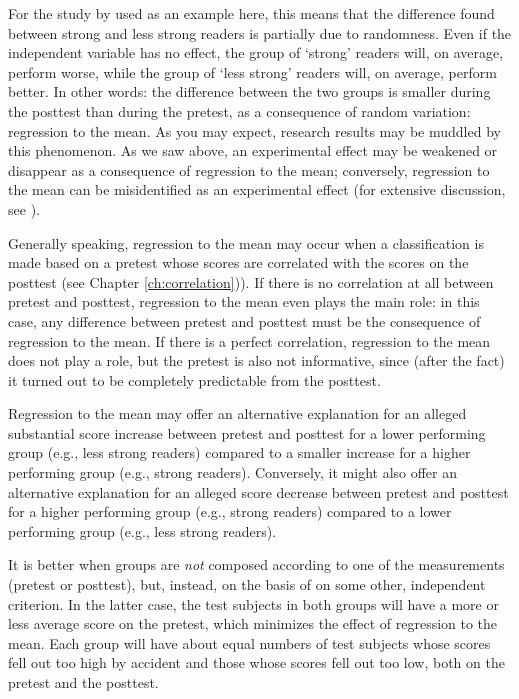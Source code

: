 \documentclass[
]{book}
\begin{document}
For the study by \citet{Dona83} used as an example here, this means that the difference found between strong and less strong readers is partially due to randomness. Even if the independent variable has no effect, the group of `strong' readers will, on average, perform worse, while the group of `less strong' readers will, on average, perform better. In other words: the difference between the two groups is smaller during the posttest than during the pretest, as a consequence of random variation: regression to the mean. As you may expect, research results may be muddled by this phenomenon. As we saw above, an experimental effect may be weakened or disappear as a consequence of regression to the mean; conversely, regression to the mean can be misidentified as an experimental effect (for extensive discussion, see \citet{RMP18}).

Generally speaking, regression to the mean may occur when a classification is made based on a pretest whose scores are correlated with the scores on the posttest (see Chapter \ref{ch:correlation})). If there is no correlation at all between pretest and posttest, regression to the mean even plays the main role: in this case, any difference between pretest and posttest must be the consequence of regression to the mean. If there is a perfect correlation, regression to the mean does not play a role, but the pretest is also not informative, since (after the fact) it turned out to be completely predictable from the posttest.

Regression to the mean may offer an alternative explanation for an alleged substantial score increase between pretest and posttest for a lower performing group (e.g., less strong readers) compared to a smaller increase for a higher performing group (e.g., strong readers). Conversely, it might also offer an alternative explanation for an alleged score decrease between pretest and posttest for a higher performing group (e.g., strong readers) compared to a lower performing group (e.g., less strong readers).

It is better when groups are \emph{not} composed according to one of the measurements (pretest or posttest), but, instead, on the basis of on some other, independent criterion. In the latter case, the test subjects in both groups will have a more or less average score on the pretest, which minimizes the effect of regression to the mean. Each group will have about equal numbers of test subjects whose scores fell out too high by accident and those whose scores fell out too low, both on the pretest and the posttest.
\end{document}
